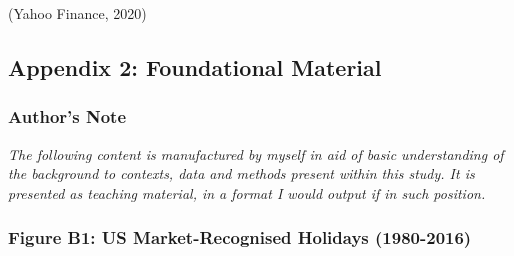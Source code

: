 \documentclass[11pt, english]{article}
\begin{document}
                        (Yahoo Finance, 2020)

	\subsection*{Appendix 2: Foundational Material}

		\subsubsection*{Author's Note}

			\textit{The following content is manufactured by myself in aid of basic understanding of the background to contexts, data and methods present within this study. It is presented as teaching material, in a format I would output if in such position.}

		\subsubsection*{Figure B1: US Market-Recognised Holidays (1980-2016)}
\end{document}
